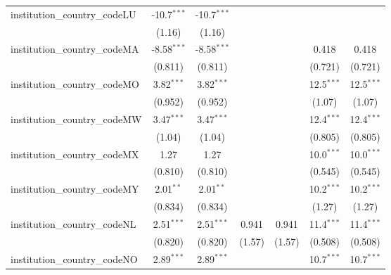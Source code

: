 \begin{tabular}{lcccccc}
   institution\_country\_codeLU          & -10.7$^{***}$  & -10.7$^{***}$  &               &               &               &   \\   
                                         & (1.16)         & (1.16)         &               &               &               &   \\   
   institution\_country\_codeMA          & -8.58$^{***}$  & -8.58$^{***}$  &               &               & 0.418         & 0.418\\   
                                         & (0.811)        & (0.811)        &               &               & (0.721)       & (0.721)\\   
   institution\_country\_codeMO          & 3.82$^{***}$   & 3.82$^{***}$   &               &               & 12.5$^{***}$  & 12.5$^{***}$\\   
                                         & (0.952)        & (0.952)        &               &               & (1.07)        & (1.07)\\   
   institution\_country\_codeMW          & 3.47$^{***}$   & 3.47$^{***}$   &               &               & 12.4$^{***}$  & 12.4$^{***}$\\   
                                         & (1.04)         & (1.04)         &               &               & (0.805)       & (0.805)\\   
   institution\_country\_codeMX          & 1.27           & 1.27           &               &               & 10.0$^{***}$  & 10.0$^{***}$\\   
                                         & (0.810)        & (0.810)        &               &               & (0.545)       & (0.545)\\   
   institution\_country\_codeMY          & 2.01$^{**}$    & 2.01$^{**}$    &               &               & 10.2$^{***}$  & 10.2$^{***}$\\   
                                         & (0.834)        & (0.834)        &               &               & (1.27)        & (1.27)\\   
   institution\_country\_codeNL          & 2.51$^{***}$   & 2.51$^{***}$   & 0.941         & 0.941         & 11.4$^{***}$  & 11.4$^{***}$\\   
                                         & (0.820)        & (0.820)        & (1.57)        & (1.57)        & (0.508)       & (0.508)\\   
   institution\_country\_codeNO          & 2.89$^{***}$   & 2.89$^{***}$   &               &               & 10.7$^{***}$  & 10.7$^{***}$\\   

\end{tabular}
